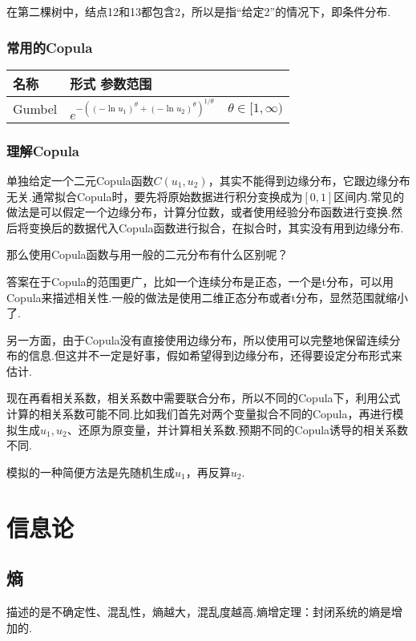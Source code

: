 在第二棵树中，结点12和13都包含2，所以是指“给定2”的情况下，即条件分布.

\subsubsection{常用的Copula}
\begin{longtable}{X{} X{} X{}}
\toprule
名称& 形式 参数范围 \\
\midrule
Gumbel& $e^{-\left((-\ln u_1)^\theta+(-\ln u_2)^\theta\right)^{1/\theta}}$ &$\theta\in[1,\infty)$\\
\bottomrule
\end{longtable}

\subsubsection{理解Copula}
单独给定一个二元Copula函数$C(u_1,u_2)$，其实不能得到边缘分布，它跟边缘分布无关.通常拟合Copula时，要先将原始数据进行积分变换成为$[0,1]$区间内.常见的做法是可以假定一个边缘分布，计算分位数，或者使用经验分布函数进行变换.然后将变换后的数据代入Copula函数进行拟合，在拟合时，其实没有用到边缘分布.

那么使用Copula函数与用一般的二元分布有什么区别呢？

答案在于Copula的范围更广，比如一个连续分布是正态，一个是t分布，可以用Copula来描述相关性.一般的做法是使用二维正态分布或者t分布，显然范围就缩小了.

另一方面，由于Copula没有直接使用边缘分布，所以使用可以完整地保留连续分布的信息.但这并不一定是好事，假如希望得到边缘分布，还得要设定分布形式来估计.

现在再看相关系数，相关系数中需要联合分布，所以不同的Copula下，利用公式计算的相关系数可能不同.比如我们首先对两个变量拟合不同的Copula，再进行模拟生成$u_1,u_2$、还原为原变量，并计算相关系数.预期不同的Copula诱导的相关系数不同.

模拟的一种简便方法是先随机生成$u_1$，再反算$u_2$.




\section{信息论}
\subsection{熵}
描述的是不确定性、混乱性，熵越大，混乱度越高.熵增定理：封闭系统的熵是增加的.

